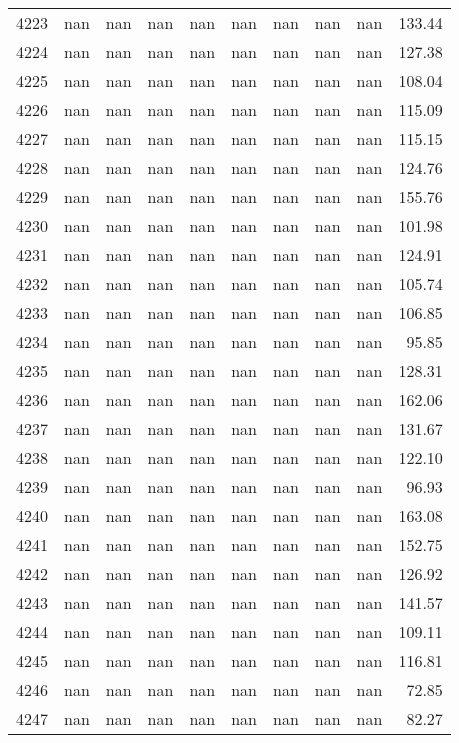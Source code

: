 \begin{tabular}{lrrrrrrrrr}
4223 & nan & nan & nan & nan & nan & nan & nan & nan & 133.44 \\
4224 & nan & nan & nan & nan & nan & nan & nan & nan & 127.38 \\
4225 & nan & nan & nan & nan & nan & nan & nan & nan & 108.04 \\
4226 & nan & nan & nan & nan & nan & nan & nan & nan & 115.09 \\
4227 & nan & nan & nan & nan & nan & nan & nan & nan & 115.15 \\
4228 & nan & nan & nan & nan & nan & nan & nan & nan & 124.76 \\
4229 & nan & nan & nan & nan & nan & nan & nan & nan & 155.76 \\
4230 & nan & nan & nan & nan & nan & nan & nan & nan & 101.98 \\
4231 & nan & nan & nan & nan & nan & nan & nan & nan & 124.91 \\
4232 & nan & nan & nan & nan & nan & nan & nan & nan & 105.74 \\
4233 & nan & nan & nan & nan & nan & nan & nan & nan & 106.85 \\
4234 & nan & nan & nan & nan & nan & nan & nan & nan & 95.85 \\
4235 & nan & nan & nan & nan & nan & nan & nan & nan & 128.31 \\
4236 & nan & nan & nan & nan & nan & nan & nan & nan & 162.06 \\
4237 & nan & nan & nan & nan & nan & nan & nan & nan & 131.67 \\
4238 & nan & nan & nan & nan & nan & nan & nan & nan & 122.10 \\
4239 & nan & nan & nan & nan & nan & nan & nan & nan & 96.93 \\
4240 & nan & nan & nan & nan & nan & nan & nan & nan & 163.08 \\
4241 & nan & nan & nan & nan & nan & nan & nan & nan & 152.75 \\
4242 & nan & nan & nan & nan & nan & nan & nan & nan & 126.92 \\
4243 & nan & nan & nan & nan & nan & nan & nan & nan & 141.57 \\
4244 & nan & nan & nan & nan & nan & nan & nan & nan & 109.11 \\
4245 & nan & nan & nan & nan & nan & nan & nan & nan & 116.81 \\
4246 & nan & nan & nan & nan & nan & nan & nan & nan & 72.85 \\
4247 & nan & nan & nan & nan & nan & nan & nan & nan & 82.27 \\

\end{tabular}
